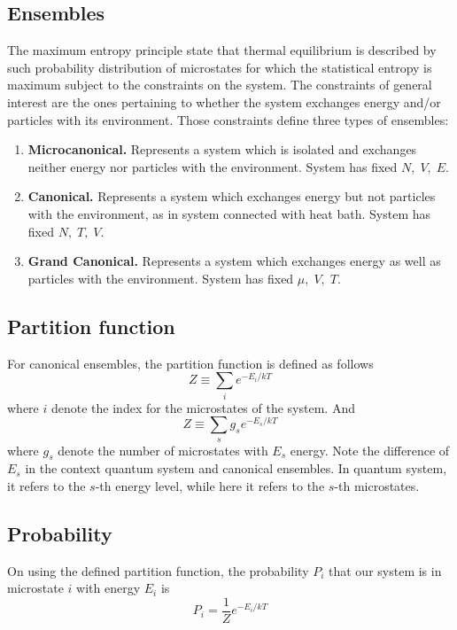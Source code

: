 \documentclass[../../../Main.tex]{subfiles}
\begin{document}
\subsection*{Ensembles}
The maximum entropy principle state that thermal equilibrium is described by such probability distribution of microstates for which the statistical entropy is maximum subject to the constraints on the system.
The constraints of general interest are the ones pertaining to whether the system exchanges energy and/or particles with its environment.
Those constraints define three types of ensembles:
\begin{enumerate}
    \item \textbf{Microcanonical.} Represents a system which is isolated and exchanges neither energy nor particles with the environment. System has fixed $N,\;V,\;E$.
    \item \textbf{Canonical.} Represents a system which exchanges energy but not particles with the environment, as in system connected with heat bath. System has fixed $N,\;T,\;V$.
    \item \textbf{Grand Canonical.} Represents a system which exchanges energy as well as particles with the environment. System has fixed $\mu,\;V,\;T$.
\end{enumerate}

\subsection*{Partition function}
For canonical ensembles, the partition function is defined as follows
\begin{equation*}
    Z\equiv \sum_i e^{-E_i/kT}
\end{equation*}
where $i$ denote the index for the microstates of the system.
And
\begin{equation*}
    Z\equiv \sum_{s} g_se^{-E_s/kT}
\end{equation*}
where $g_s$ denote the number of microstates with $E_s$ energy. 
Note the difference of $E_s$ in the context quantum system and canonical ensembles.
In quantum system, it refers to the $s$-th energy level, while here it refers to the $s$-th microstates.


\subsection*{Probability}
On using the defined partition function, the probability $P_i$ that our system is in microstate $i$ with energy $E_i$ is
\begin{equation*}
    P_i=\frac{1}{Z}e^{-E_i/kT}
\end{equation*}
\end{document}
